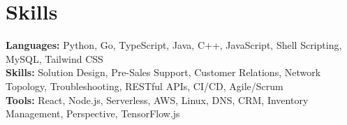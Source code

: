 \documentclass[11pt]{article}       %
\begin{document}

\vspace{-18.5pt}


\section*{Skills}
\textbf{Languages:} Python, Go, TypeScript, Java, C++, JavaScript, Shell Scripting, MySQL, Tailwind CSS\\
\textbf{Skills:} Solution Design, Pre-Sales Support, Customer Relations, Network Topology, Troubleshooting, RESTful APIs, CI/CD, Agile/Scrum\\
\textbf{Tools:} React, Node.js, Serverless, AWS, Linux, DNS, CRM, Inventory Management, Perspective, TensorFlow.js\\

\vspace{-6.5pt}
\end{document}
